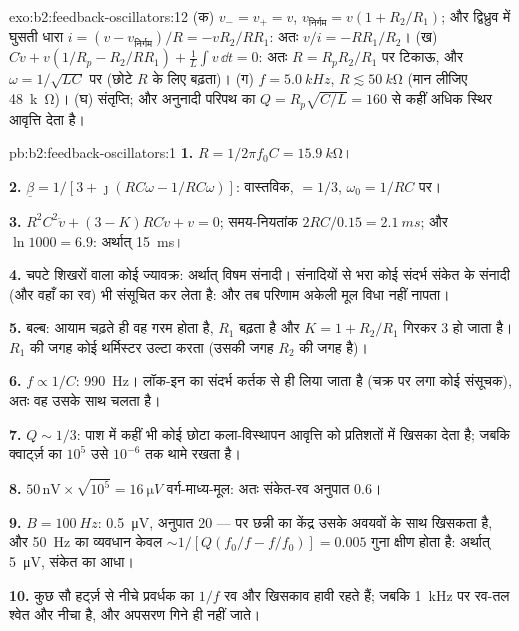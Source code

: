 \begin{solution}{exo:b2:feedback-oscillators:12}
(क) $v_- = v_+ = v$, $v_{\text{निर्गम}} = v(1 + R_2/R_1)$; और द्विध्रुव में घुसती
धारा $i = (v - v_{\text{निर्गम}})/R = -vR_2/RR_1$: अतः $v/i = -RR_1/R_2$। (ख) $C\dot v +
v(1/R_p - R_2/RR_1) + \frac1L\int v\,\dd t = 0$: अतः $R = R_pR_2/R_1$ पर टिकाऊ,
और $\omega = 1/\sqrt{LC}$ पर (छोटे $R$ के लिए बढ़ता)। (ग) $f = \qty{5.0}{kHz}$, $R \lesssim
\qty{50}{k\ohm}$ (मान लीजिए \qty{48}{k\ohm})। (घ) संतृप्ति; और अनुनादी परिपथ का $Q = R_p
\sqrt{C/L} = 160$  से कहीं अधिक स्थिर आवृत्ति देता है।
\end{solution}

\begin{solution}{pb:b2:feedback-oscillators:1}
\textbf{1.} $R = 1/2\pi f_0C = \qty{15.9}{k\ohm}$।

\textbf{2.} $\underline\beta = 1/[3 + \jmath(RC\omega - 1/RC\omega)]$: वास्तविक, $= 1/3$,
$\omega_0 = 1/RC$ पर।

\textbf{3.} $R^2C^2\ddot v + (3 - K)RC\dot v + v = 0$; समय-नियतांक $2RC/0.15 =
\qty{2.1}{ms}$; और $\ln1000 = 6.9$: अर्थात् \qty{15}{ms}।

\textbf{4.} चपटे शिखरों वाला कोई ज्यावक्र: अर्थात् विषम संनादी। संनादियों से भरा
कोई संदर्भ संकेत के संनादी (और वहाँ का रव) भी संसूचित कर लेता है:
और तब परिणाम अकेली मूल विधा नहीं नापता।

\textbf{5.} बल्ब: आयाम चढ़ते ही वह गरम होता है, $R_1$ बढ़ता है और
$K = 1 + R_2/R_1$ गिरकर $3$ हो जाता है। $R_1$ की जगह कोई थर्मिस्टर उल्टा करता
(उसकी जगह $R_2$ की जगह है)।

\textbf{6.} $f \propto 1/C$: \qty{990}{Hz}। लॉक-इन का संदर्भ कर्तक से ही
लिया जाता है (चक्र पर लगा कोई संसूचक), अतः वह उसके साथ चलता है।

\textbf{7.} $Q \sim 1/3$: पाश में कहीं भी कोई छोटा कला-विस्थापन आवृत्ति को
प्रतिशतों में खिसका देता है; जबकि क्वार्ट्ज़ का $10^5$ उसे $10^{-6}$ तक थामे रखता है।

\textbf{8.} $50\,\text{nV} \times \sqrt{10^5} = \qty{16}{\micro V}$ वर्ग-माध्य-मूल: अतः संकेत-रव अनुपात $0.6$।

\textbf{9.} $B = \qty{100}{Hz}$: \qty{0.5}{\micro V}, अनुपात $20$ --- पर छन्नी का
केंद्र उसके अवयवों के साथ खिसकता है, और \qty{50}{Hz} का व्यवधान केवल
$\sim 1/[Q(f_0/f - f/f_0)] = 0.005$ गुना क्षीण होता है: अर्थात् \qty{5}{\micro V}, संकेत का आधा।

\textbf{10.} कुछ सौ हर्ट्ज़ से नीचे प्रवर्धक का $1/f$ रव और खिसकाव
हावी रहते हैं; जबकि \qty{1}{kHz} पर रव-तल श्वेत और नीचा है, और
अपसरण गिने ही नहीं जाते।


\end{solution}
